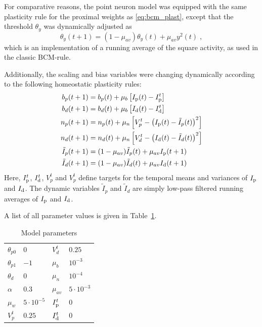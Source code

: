 \documentclass[10pt,a4paper,twocolumn]{article}
\begin{document}
		For comparative reasons, the point neuron model was equipped with the
		same plasticity rule for the proximal weights as \eqref{eq:bcm_plast}, 
		except that the threshold $\theta_y$ was dynamically adjusted as
		\begin{equation}
			\theta_y(t+1) = \left(1-\mu_{av}\right)\theta_y(t) + \mu_{av} y^2(t) \; , 
		\end{equation}
		which is an implementation of a running average of the square activity,
		as used in the classic BCM-rule.
		
		Additionally, the scaling and bias variables were changing dynamically
		according to the following homeostatic plasticity rules:
		\begin{align}
			b_p(t+1) &= b_p(t) + \mu_b \left[I_{\rm p}(t) - I_{\rm p}^t\right] \\
			b_d(t+1) &= b_d(t) + \mu_b \left[I_{\rm d}(t) - I_{\rm d}^t\right] \\
			n_p(t+1) &= n_p(t) + \mu_n \left[V_p^t - \left( I_{\rm p}(t) - \tilde{I}_p(t)\right)^2\right] \\
			n_d(t+1) &= n_d(t) + \mu_n \left[V_d^t - \left( I_{\rm d}(t) - \tilde{I}_d(t)\right)^2\right] \\
			\tilde{I}_p(t+1) &= (1-\mu_{av})\tilde{I}_p(t) + \mu_{av} I_{\rm p}(t+1) \\
			\tilde{I}_d(t+1) &= (1-\mu_{av})\tilde{I}_d(t) + \mu_{av} I_{\rm d}(t+1)
		\end{align}
		Here, $I_{\rm p}^t$, $I_{\rm d}^t$, $V_p^t$ and $V_p^t$ define targets for the 
		temporal means and variances of $I_{\rm p}$ and $I_{\rm d}$. The dynamic variables 
		$\tilde{I}_p$ and $\tilde{I}_d$ are simply low-pass filtered running 
		averages of $I_{\rm p}$ and $I_{\rm d}$.
		
		A list of all parameter values is given in Table~\ref{tab:parameters}.
		
		\begin{table}
			\begin{tabular}{ l | l || l | l }
				$\theta_{p0}$ & $0$ & $V_d^t$ & $0.25$ \\
				$\theta_{p1}$ & $-1$ & $\mu_b$ & $10^{-3}$ \\ 
				$\theta_{d}$ & $0$ & $\mu_n$ & $10^{-4}$ \\  
				$\alpha$ & $0.3$ & $\mu_{av}$ & $5 \cdot 10^{-3}$ \\   
				$\mu_w$ & $5 \cdot 10^{-5}$ & $I_{\rm p}^t$ & $0$ \\
				$V_p^t$ & $0.25$ & $I_{\rm d}^t$ & $0$  
			\end{tabular}
		\caption{Model parameters}
		\label{tab:parameters}
		\end{table}
		
\end{document}
